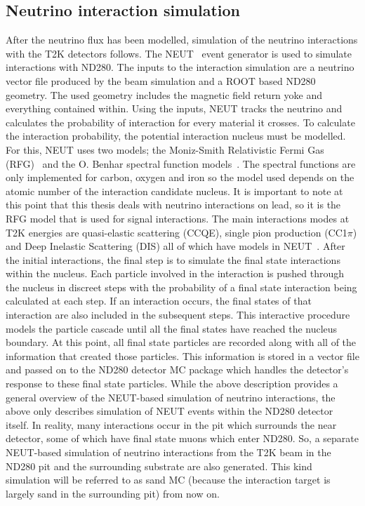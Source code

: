 \subsection{Neutrino interaction simulation}
\label{subsec:NeutrinoInteractionSimulation}
After the neutrino flux has been modelled, simulation of the neutrino interactions with the T2K detectors follows.  The NEUT~\cite{Hayato2002171} event generator is used to simulate interactions with ND280.  The inputs to the interaction simulation are a neutrino vector file produced by the beam simulation and a ROOT based ND280 geometry.  The used geometry includes the magnetic field return yoke and everything contained within.  Using the inputs, NEUT tracks the neutrino and calculates the probability of interaction for every material it crosses.  To calculate the interaction probability, the potential interaction nucleus must be modelled.  For this, NEUT uses two models; the Moniz-Smith Relativistic Fermi Gas (RFG)~\cite{Miller2002223} and the O. Benhar spectral function models~\cite{Benhar1994493}.  The spectral functions are only implemented for carbon, oxygen and iron so the model used depends on the atomic number of the interaction candidate nucleus.  It is important to note at this point that this thesis deals with neutrino interactions on lead, so it is the RFG model that is used for signal interactions.
\newline 
\newline
The main interactions modes at T2K energies are quasi-elastic scattering (CCQE), single pion production  (CC1$\pi$) and Deep Inelastic Scattering (DIS) all of which have models in NEUT~\cite{LlewellynSmith1972261,Rein198179,1126-6708-2006-05-026}.
\newline
\newline
After the initial interactions, the final step is to simulate the final state interactions within the nucleus.  Each particle involved in the interaction is pushed through the nucleus in discreet steps with the probability of a final state interaction being calculated at each step.  If an interaction occurs, the final states of that interaction are also included in the subsequent steps.  This interactive procedure models the particle cascade until all the final states have reached the nucleus boundary.  At this point, all final state particles are recorded along with all of the information that created those particles.  This information is stored in a vector file and passed on to the ND280 detector MC package which handles the detector's response to these final state particles.
\newline
\newline
While the above description provides a general overview of the NEUT-based simulation of neutrino interactions, the above only describes simulation of NEUT events within the ND280 detector itself.  In reality, many interactions occur in the pit which surrounds the near detector, some of which have final state muons which enter ND280.  So, a separate NEUT-based simulation of neutrino interactions from the T2K beam in the ND280 pit and the surrounding substrate are also generated.  This kind simulation will be referred to as sand MC (because the interaction target is largely sand in the surrounding pit) from now on.
